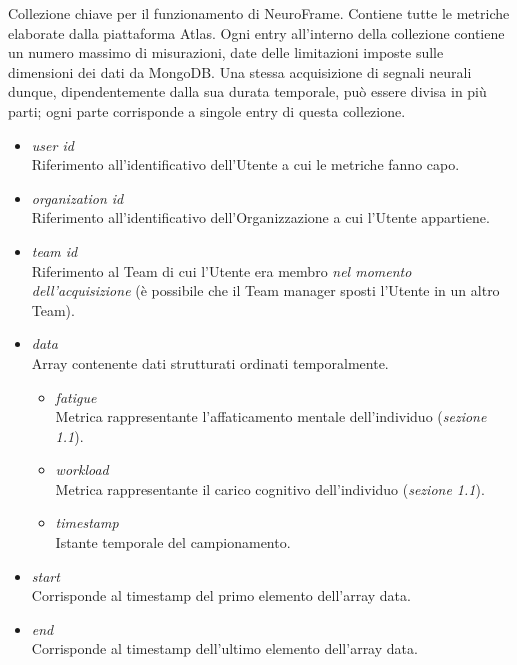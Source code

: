 \newline
Collezione chiave per il funzionamento di NeuroFrame. Contiene tutte le metriche elaborate dalla piattaforma Atlas.\newline
Ogni entry all'interno della collezione contiene un numero massimo di misurazioni, date delle limitazioni imposte sulle dimensioni dei dati da MongoDB. Una stessa acquisizione di segnali neurali dunque, dipendentemente dalla sua durata temporale, può essere divisa in più parti; ogni parte corrisponde a singole entry di questa collezione.
\begin{itemize}
  \item \emph{user id}\\
  {Riferimento all'identificativo dell'Utente a cui le metriche fanno capo.}
  \item \emph{organization id}\\
  {Riferimento all'identificativo dell'Organizzazione a cui l'Utente appartiene.}
  \item \emph{team id}\\
  {Riferimento al Team di cui l'Utente era membro \emph{nel momento dell'acquisizione} (è possibile che il Team manager sposti l'Utente in un altro Team).}
  \item \emph{data}\\
  {Array contenente dati strutturati ordinati temporalmente.}
  {\begin{itemize}
    \item \emph{fatigue}\\
    {Metrica rappresentante l'affaticamento mentale dell'individuo (\emph{sezione 1.1}).}
    \item \emph{workload}\\
    {Metrica rappresentante il carico cognitivo dell'individuo (\emph{sezione 1.1}).}
    \item \emph{timestamp}\\
    {Istante temporale del campionamento.}
  \end{itemize}}
  \item \emph{start}\\
  {Corrisponde al timestamp del primo elemento dell'array data.}
  \item \emph{end}\\
  {Corrisponde al timestamp dell'ultimo elemento dell'array data.}
\end{itemize}